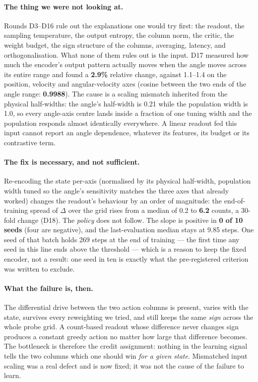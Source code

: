 \documentclass[11pt]{article}
\begin{document}
\paragraph{The thing we were not looking at.} Rounds D3--D16 rule out the
explanations one would try first: the readout, the sampling temperature, the
output entropy, the column norm, the critic, the weight budget, the sign
structure of the columns, averaging, latency, and orthogonalisation. What none of
them rules out is the input. D17 measured how much the encoder's output pattern
actually moves when the angle moves across its entire range and found a
\textbf{2.9\%} relative change, against 1.1--1.4 on the position, velocity and
angular-velocity axes (cosine between the two ends of the angle range:
\textbf{0.9988}). The cause is a scaling mismatch inherited from the physical
half-widths: the angle's half-width is 0.21 while the population width is 1.0, so
every angle-axis centre lands inside a fraction of one tuning width and the
population responds almost identically everywhere. A linear readout fed this
input cannot report an angle dependence, whatever its features, its budget or its
contrastive term.

\paragraph{The fix is necessary, and not sufficient.} Re-encoding the state
per-axis (normalised by its physical half-width, population width tuned so the
angle's sensitivity matches the three axes that already worked) changes the
readout's behaviour by an order of magnitude: the end-of-training spread of
$\Delta$ over the grid rises from a median of 0.2 to \textbf{6.2} counts, a
30-fold change (D18). The \emph{policy} does not follow. The slope is positive in
\textbf{0 of 10 seeds} (four are negative), and the last-evaluation median stays
at 9.85 steps. One seed of that batch holds 269 steps at the end of training ---
the first time any seed in this line ends above the threshold --- which is a
reason to keep the fixed encoder, not a result: one seed in ten is exactly what
the pre-registered criterion was written to exclude.

\paragraph{What the failure is, then.} The differential drive between the two
action columns is present, varies with the state, survives every reweighting we
tried, and still keeps the same \emph{sign} across the whole probe grid. A
count-based readout whose difference never changes sign produces a constant
greedy action no matter how large that difference becomes. The bottleneck is
therefore the credit assignment: nothing in the learning signal tells the two
columns which one should win \emph{for a given state}. Mismatched input scaling
was a real defect and is now fixed; it was not the cause of the failure to learn.
\end{document}
